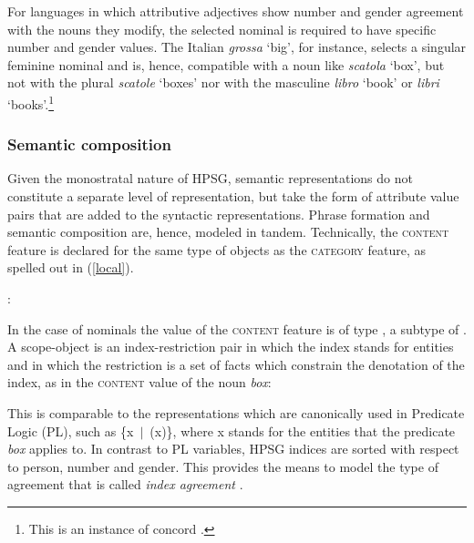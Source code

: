 \documentclass[output=paper
	        ,collection
	        ,collectionchapter
 	        ,biblatex
                ,babelshorthands
                ,newtxmath
                ,draftmode
                ,colorlinks, citecolor=brown
]{langscibook}
\begin{document}
For languages in which attributive adjectives show number and gender agreement 
with the nouns they modify, the selected nominal is required to have specific 
number and gender values. The Italian \emph{grossa} `big', for instance, 
selects a singular feminine nominal and is, hence, compatible with a noun like 
\emph{scatola} `box', but not with the plural \emph{scatole} `boxes' nor with 
the masculine \emph{libro} `book' or \emph{libri} `books'.\footnote{This is an 
instance of concord .}  


\subsubsection{Semantic composition}
\label{semco} 


Given the monostratal nature of HPSG, semantic representations 
do not constitute a separate level of representation, but take the form 
of attribute value pairs that are added to the syntactic representations.   
Phrase formation and semantic composition are, hence, modeled in tandem.  
Technically, the \textsc{content} feature is declared for the same type of objects 
as the \textsc{category} feature, as spelled out in (\ref{local}). 

\begin{exe} 
\ex\label{local}  : \begin{avm} 
                   \end{avm} 
\end{exe} 

\noindent 
In the case of nominals the value of the \textsc{content} feature is of 
type , a subtype of  \citep[122]{GS00}. 
A scope-object is an index-restriction pair in which the index stands for 
entities and in which the restriction is a set of facts which constrain the 
denotation of the index, as in the \textsc{content} value of the noun \emph{box}:    

\ea\label{red} 
\z

\noindent
This is comparable to the representations which are canonically used in 
Predicate Logic (PL), such as \{x~$|$~(x)\}, where x stands for 
the entities that the predicate \emph{box} applies to. In contrast to 
PL variables, HPSG indices are sorted with respect to person, number 
and gender. This provides the means to model the type of agreement that 
is called \emph{index agreement} .
\end{document}
